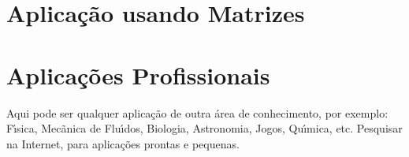    \section{Aplica\c{c}\~{a}o usando Matrizes}


    \section{Aplica\c{c}\~{o}es Profissionais}
    Aqui pode ser qualquer aplica\c{c}\~{a}o de outra \'{a}rea de conhecimento, por exemplo: F\'{\i}sica, Mec\~{a}nica de Flu\'{\i}dos, Biologia, Astronomia, Jogos, Qu\'{\i}mica, etc. Pesquisar na Internet, para aplica\c{c}\~{o}es prontas e pequenas.


